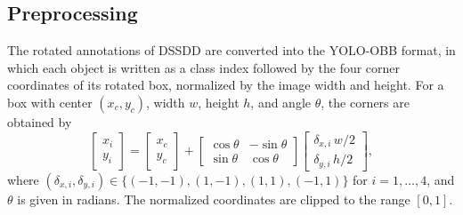 \documentclass[conference]{IEEEtran}
\begin{document}
\subsection{Preprocessing}
The rotated annotations of DSSDD are converted into the YOLO-OBB format, in which each object is written as a class index followed by the four corner coordinates of its rotated box, normalized by the image width and height. For a box with center $(x_c, y_c)$, width $w$, height $h$, and angle $\theta$, the corners are obtained by
\begin{equation}
	\begin{bmatrix} x_i \\ y_i \end{bmatrix} =
	\begin{bmatrix} x_c \\ y_c \end{bmatrix} +
	\begin{bmatrix} \cos\theta & -\sin\theta \\ \sin\theta & \cos\theta \end{bmatrix}
	\begin{bmatrix} \delta_{x,i}\, w/2 \\ \delta_{y,i}\, h/2 \end{bmatrix},
	\label{eq:corners}
\end{equation}
where $(\delta_{x,i}, \delta_{y,i}) \in \{(-1,-1), (1,-1), (1,1), (-1,1)\}$ for $i = 1, \dots, 4$, and $\theta$ is given in radians. The normalized coordinates are clipped to the range $[0, 1]$.
\end{document}
